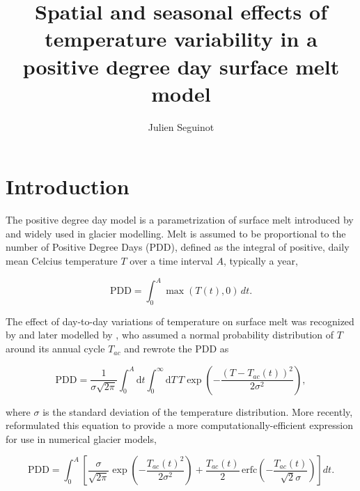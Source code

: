 \documentclass[review]{igs}
\begin{document}
\title[Temperature variability in a positive degree day model]{Spatial and seasonal effects of temperature variability in a positive degree day surface melt model}
\author[J. Seguinot]{Julien Seguinot}

\maketitle


\section{Introduction}

The positive degree day model is a parametrization of surface melt introduced by \citet{braithwaite-1984} and widely used in glacier modelling. Melt is assumed to be proportional to the number of Positive Degree Days (PDD), defined as the integral of positive, daily mean Celcius temperature $T$ over a time interval $A$, typically a year,

\begin{equation} \label{eq:pdd}
  \mathrm{PDD} = \int_{0}^{A}\max(T(t),0)\,dt.
\end{equation}

The effect of day-to-day variations of temperature on surface melt was recognized by \citet{braithwaite-1984} and later modelled by \citet{reeh-1991}, who assumed a normal probability distribution of $T$ around its annual cycle $T_{ac}$ and rewrote the PDD as

\begin{equation} \label{eq:reeh}
  \mathrm{PDD} = \frac{1}{\sigma\sqrt{2\pi}}
    \int_{0}^{A} \mathrm{d}t
    \int_{0}^{\infty} \mathrm{d}T \,
    T \exp\left({-\frac{(T-T_{ac}(t))^2}{2\sigma^2}}\right),
\end{equation}

where $\sigma$ is the standard deviation of the temperature distribution. More recently, \citet{calov-greve-2005} reformulated this equation to provide a more computationally-efficient expression for use in numerical glacier models,

\begin{equation} \label{eq:calovgreve}
  \mathrm{PDD} = \int_{0}^{A} \left[
    \frac{\sigma}{\sqrt{2\pi}}
    \exp\left({-\frac{T_{ac}(t)^2}{2\sigma^2}}\right)
    +\frac{T_{ac}(t)}{2} \,
    \mathrm{erfc} \left(-\frac{T_{ac}(t)}{\sqrt{2}\sigma}\right)
  \right]dt.
\end{equation}
\end{document}
